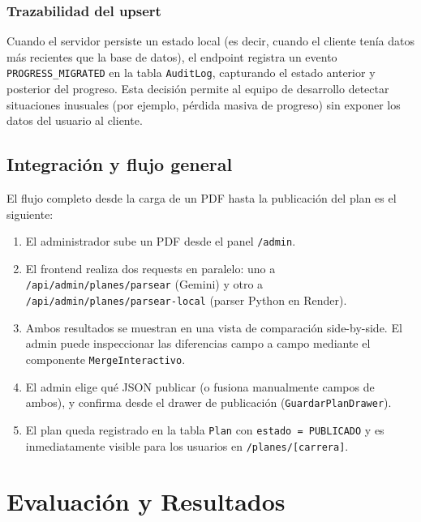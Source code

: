 \documentclass[12pt, a4paper]{report}
\begin{document}
\subsection{Trazabilidad del upsert}

Cuando el servidor persiste un estado local (es decir, cuando el cliente tenía
datos más recientes que la base de datos), el endpoint registra un evento
\texttt{PROGRESS\_MIGRATED} en la tabla \texttt{AuditLog}, capturando el estado
anterior y posterior del progreso. Esta decisión permite al equipo de desarrollo
detectar situaciones inusuales (por ejemplo, pérdida masiva de progreso) sin
exponer los datos del usuario al cliente.

\section{Integración y flujo general}
\label{sec:integracion-flujo}

El flujo completo desde la carga de un PDF hasta la publicación del plan
es el siguiente:

\begin{enumerate}
  \item El administrador sube un PDF desde el panel \texttt{/admin}.
  \item El frontend realiza dos requests en paralelo: uno a
        \texttt{/api/admin/planes/parsear} (Gemini) y otro a
        \texttt{/api/admin/planes/parsear-local} (parser Python en Render).
  \item Ambos resultados se muestran en una vista de comparación side-by-side.
        El admin puede inspeccionar las diferencias campo a campo mediante el
        componente \texttt{MergeInteractivo}.
  \item El admin elige qué JSON publicar (o fusiona manualmente campos de ambos),
        y confirma desde el drawer de publicación (\texttt{GuardarPlanDrawer}).
  \item El plan queda registrado en la tabla \texttt{Plan} con
        \texttt{estado = PUBLICADO} y es inmediatamente visible para los usuarios
        en \texttt{/planes/[carrera]}.
\end{enumerate}

\chapter{Evaluación y Resultados}
\label{cap:evaluacion}
\end{document}
